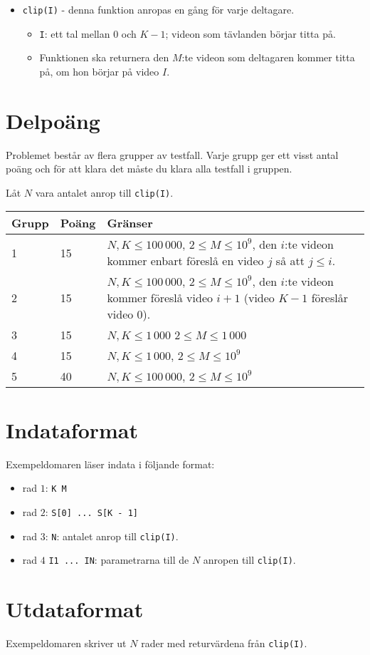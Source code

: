 \begin{itemize}
  \item \texttt{clip(I)} - denna funktion anropas en gång för varje deltagare.
  \begin{itemize}
    \item \texttt{I}: ett tal mellan $0$ och $K - 1$; videon som tävlanden börjar titta på.
		\item Funktionen ska returnera den $M$:te videon som deltagaren kommer titta på, om hon börjar på video $I$.
  \end{itemize}
\end{itemize}

\section*{Delpoäng}
Problemet består av flera grupper av testfall. Varje grupp ger ett visst antal poäng och för att klara det måste du klara alla testfall i gruppen.

Låt $N$ vara antalet anrop till \texttt{clip(I)}.

\begin{tabular}{|l|l|p{7cm}|}
  \hline
  \textbf{Grupp} & \textbf{Poäng} & \textbf{Gränser} \\ \hline
  1 & 15 & $N, K \le 100\,000$, $2 \le M \le 10^9$, den $i$:te videon kommer enbart föreslå en video $j$ så att $j \le i$. \\ \hline
  2 & 15 & $N, K \le 100\,000$, $2 \le M \le 10^9$, den $i$:te videon kommer föreslå video $i + 1$ (video $K - 1$ föreslår video 0). \\ \hline
  3 & 15 & $N, K \le 1\,000$ $2 \le M \le 1\,000$ \\ \hline
  4 & 15 & $N, K \le 1\,000$, $2 \le M \le 10^9$ \\ \hline
  5 & 40 & $N, K \le 100\,000$, $2 \le M \le 10^9$ \\ \hline
\end{tabular}

\section*{Indataformat}
Exempeldomaren läser indata i följande format:

\begin{itemize}
  \item rad $1$: \texttt{K M}
  \item rad $2$: \texttt{S[0] ... S[K - 1]}
  \item rad $3$: \texttt{N}: antalet anrop till \texttt{clip(I)}.
  \item rad $4$ \texttt{I1 ... IN}: parametrarna till de $N$ anropen till \texttt{clip(I)}.
\end{itemize}

\section*{Utdataformat}
Exempeldomaren skriver ut $N$ rader med returvärdena från \texttt{clip(I)}.
